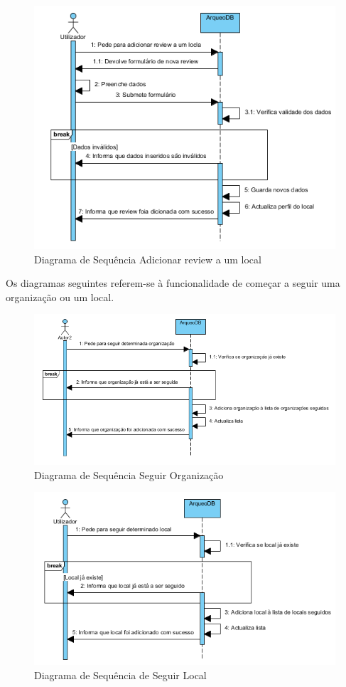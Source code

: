 \documentclass[12pt,a4paper]{article}
\begin{document}
\begin{figure}[h!]
\centering
\includegraphics[scale=1]{sequencia/adicionarreview}
\caption{Diagrama de Sequência Adicionar review a um local} 
\end{figure}

\clearpage
Os diagramas seguintes referem-se à funcionalidade de começar a seguir uma organização ou um local.\\

\begin{figure}[h!]
\centering
\includegraphics[scale=0.8]{sequencia/seguirorganizacao}
\caption{Diagrama de Sequência Seguir Organização} 
\end{figure}

\begin{figure}[h!]
\centering
\includegraphics[scale=0.8]{sequencia/seguirlocal}
\caption{Diagrama de Sequência de Seguir Local} 
\end{figure}
\end{document}
